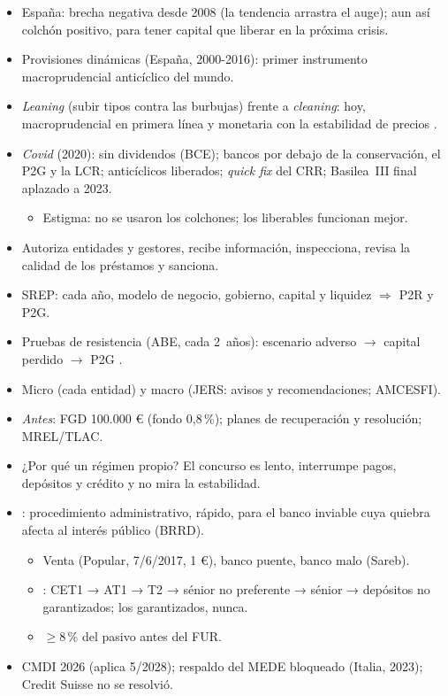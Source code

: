 \documentclass{article}
\begin{document}
\begin{columnas}
\begin{itemize}
\item España: brecha negativa desde 2008 (la tendencia arrastra el auge); aun así colchón positivo, para tener capital que liberar en la próxima crisis.
\item Provisiones dinámicas (España, 2000-2016): primer instrumento macroprudencial anticíclico del mundo.
\item \emph{Leaning} (subir tipos contra las burbujas) frente a \emph{cleaning}: hoy, macroprudencial en primera línea y monetaria con la estabilidad de precios .
\item \emph{Covid} (2020): sin dividendos (BCE); bancos por debajo de la conservación, el P2G y la LCR; anticíclicos liberados; \emph{quick fix} del CRR; Basilea~III final aplazado a 2023.
  \begin{itemize}
  \item Estigma: no se usaron los colchones; los liberables funcionan mejor.
  \end{itemize}
\end{itemize}
\begin{itemize}
\item Autoriza entidades y gestores, recibe información, inspecciona, revisa la calidad de los préstamos y sanciona.
\item SREP: cada año, modelo de negocio, gobierno, capital y liquidez $\Rightarrow$ P2R y P2G.
\item Pruebas de resistencia (ABE, cada 2~años): escenario adverso $\to$ capital perdido $\to$ P2G .
\item Micro (cada entidad) y macro (JERS: avisos y recomendaciones; AMCESFI).
\end{itemize}
\begin{itemize}
\item \emph{Antes}: FGD 100.000 € (fondo 0,8\,\%); planes de recuperación y resolución; MREL/TLAC.
\item ¿Por qué un régimen propio? El concurso es lento, interrumpe pagos, depósitos y crédito y no mira la estabilidad.
\item {}: procedimiento administrativo, rápido, para el banco inviable cuya quiebra afecta al interés público (BRRD).
  \begin{itemize}
  \item Venta (Popular, 7/6/2017, 1 €), banco puente, banco malo (Sareb).
  \item {}: CET1 → AT1 → T2 → sénior no preferente → sénior → depósitos no garantizados; los garantizados, nunca.
  \item $\geq$8\,\% del pasivo antes del FUR.
  \end{itemize}
\item CMDI 2026 (aplica 5/2028); respaldo del MEDE bloqueado (Italia, 2023); Credit Suisse no se resolvió.
\end{itemize}


\end{columnas}
\end{document}
